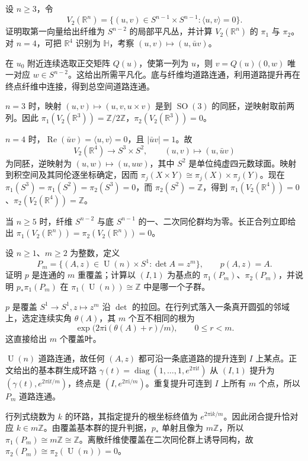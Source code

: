 \begin{exercise}\label{g2:ex:two-frames-homotopy}
	设 \(n\ge3\)，令
	\[
		V_2(\mathbb R^n)=\{(u,v)\in S^{n-1}\times S^{n-1}:\langle u,v\rangle=0\}.
	\]
	证明取第一向量给出纤维为 \(S^{n-2}\) 的局部平凡丛，并计算 \(V_2(\mathbb R^n)\) 的 \(\pi_1\) 与 \(\pi_2\)。对 \(n=4\)，可把 \(\mathbb R^4\) 识别为 \(\mathbb H\)，考察 \((u,v)\mapsto(u,\bar u v)\)。
\end{exercise}
\begin{solution}
	在 \(u_0\) 附近连续选取正交矩阵 \(Q(u)\)，使第一列为 \(u\)，则 \(v=Q(u)(0,w)\) 唯一对应 \(w\in S^{n-2}\)。这给出所需平凡化。底与纤维均道路连通，利用道路提升再在终点纤维中连接，得到总空间道路连通。

	\(n=3\) 时，映射 \((u,v)\mapsto(u,v,u\times v)\) 是到 \(\operatorname{SO}(3)\) 的同胚，逆映射取前两列。因此 \(\pi_1(V_2(\mathbb R^3))=\mathbb Z/2\mathbb Z\)，\(\pi_2(V_2(\mathbb R^3))=0\)。

	\(n=4\) 时，\(\operatorname{Re}(\bar u v)=\langle u,v\rangle=0\)，且 \(|\bar u v|=1\)。故
	\[
		V_2(\mathbb R^4)\longrightarrow S^3\times S^2,\qquad(u,v)\longmapsto(u,\bar u v)
	\]
	为同胚，逆映射为 \((u,w)\mapsto(u,uw)\)，其中 \(S^2\) 是单位纯虚四元数球面。映射到积空间及其同伦逐坐标确定，因而 \(\pi_j(X\times Y)\cong\pi_j(X)\times\pi_j(Y)\)。现在 \(\pi_1(S^3)=\pi_1(S^2)=\pi_2(S^3)=0\)，而 \(\pi_2(S^2)=\mathbb Z\)，得到 \(\pi_1(V_2(\mathbb R^4))=0\)、\(\pi_2(V_2(\mathbb R^4))=\mathbb Z\)。

	当 \(n\ge5\) 时，纤维 \(S^{n-2}\) 与底 \(S^{n-1}\) 的一、二次同伦群均为零。长正合列立即给出 \(\pi_1(V_2(\mathbb R^n))=\pi_2(V_2(\mathbb R^n))=0\)。
\end{solution}

\begin{exercise}\label{g2:ex:unitary-root-cover}
	设 \(n\ge1\)、\(m\ge2\) 为整数，定义
	\[
		P_m=\{(A,z)\in\operatorname{U}(n)\times S^1:\det A=z^m\},\qquad p(A,z)=A.
	\]
	证明 \(p\) 是连通的 \(m\) 重覆盖；计算以 \((I,1)\) 为基点的 \(\pi_1(P_m)\)、\(\pi_2(P_m)\)，并说明 \(p_*\pi_1(P_m)\) 在 \(\pi_1(\operatorname{U}(n))\cong\mathbb Z\) 中是哪一个子群。
\end{exercise}
\begin{solution}
	\(p\) 是覆盖 \(S^1\rightarrow S^1,z\mapsto z^m\) 沿 \(\det\) 的拉回。在行列式落入一条真开圆弧的邻域上，选定连续实角 \(\theta(A)\)，其 \(m\) 个互不相同的根为
	\[
		\exp\bigl(2\pi\mathrm{i}(\theta(A)+r)/m\bigr),\qquad 0\le r<m.
	\]
	这直接给出 \(m\) 个覆盖叶。

	\(\operatorname{U}(n)\) 道路连通，故任何 \((A,z)\) 都可沿一条底道路的提升连到 \(I\) 上某点。正文给出的基本群生成环路 \(\gamma(t)=\operatorname{diag}(1,\ldots,1,e^{2\pi\mathrm{i}t})\) 从 \((I,1)\) 提升为 \((\gamma(t),e^{2\pi\mathrm{i}t/m})\)，终点是 \((I,e^{2\pi\mathrm{i}/m})\)。重复提升可连到 \(I\) 上所有 \(m\) 个点，所以 \(P_m\) 道路连通。

	行列式绕数为 \(k\) 的环路，其指定提升的根坐标终值为 \(e^{2\pi\mathrm{i}k/m}\)。因此闭合提升恰对应 \(k\in m\mathbb Z\)。由覆盖基本群的提升判据，\(p_*\) 单射且像为 \(m\mathbb Z\)，所以 \(\pi_1(P_m)\cong m\mathbb Z\cong\mathbb Z\)。离散纤维使覆盖在二次同伦群上诱导同构，故 \(\pi_2(P_m)\cong\pi_2(\operatorname{U}(n))=0\)。
\end{solution}

